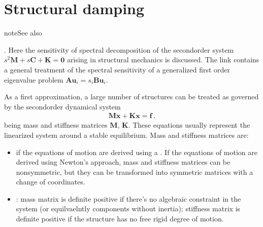 \documentclass[letterpaper,10pt,english]{jupyterBook}
\begin{document}
\sphinxstepscope


\chapter{Structural damping}
\label{\detokenize{ch/solids/structural-damping:structural-damping}}\label{\detokenize{ch/solids/structural-damping:solid-mechanics-intro-small-displacements-damping}}\label{\detokenize{ch/solids/structural-damping::doc}}
\begin{sphinxadmonition}{note}{See also}

\sphinxAtStartPar
{}. Here the sensitivity of spectral decomposition of the second\sphinxhyphen{}order system \(s^2 \mathbf{M} + s \mathbf{C} + \mathbf{K} = \mathbf{0}\) arising in structural mechanics is discussed. The link contains a general treatment of the spectral sensitivity of a generalized first order eigenvalue problem \(\mathbf{A} \mathbf{u}_i = s_i \mathbf{B} \mathbf{u}_i\).
\end{sphinxadmonition}

\sphinxAtStartPar
As a first approximation, a large number of structures can be treated as  governed by the second\sphinxhyphen{}order dynamical system
\begin{equation*}
\begin{split}\mathbf{M} \ddot{\mathbf{x}} + \mathbf{K} \mathbf{x} = \mathbf{f} \ .\end{split}
\end{equation*}
\sphinxAtStartPar
being mass and stiffness matrices \(\mathbf{M}\), \(\mathbf{K}\). These equations usually represent the linearized system around a stable equilibrium. Mass and stiffness matrices are:
\begin{itemize}
\item {} 
\sphinxAtStartPar
{} if the equations of motion are derived using a . If the equations of motion are derived using Newton’s approach, mass and stiffness matrices can be non\sphinxhyphen{}symmetric, but they can be transformed into symmetric matrices with a change of coordinates.

\item {} 
\sphinxAtStartPar
{}: mass matrix is definite positive if there’s no algebraic constraint in the system  (or \sphinxhyphen{} equilvaelntly \sphinxhyphen{} components without inertia); stiffness matrix is definite positive if the structure has no free rigid degree of motion.

\end{itemize}
\end{document}
